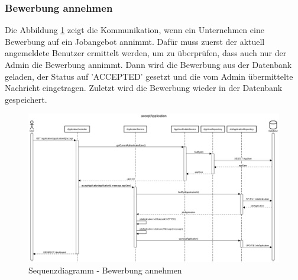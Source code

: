 \documentclass[12pt, letterpaper]{article}
\begin{document}
    \subsubsection{Bewerbung annehmen}

    Die Abbildung \ref{fig:Accept} zeigt die Kommunikation, wenn ein Unternehmen eine Bewerbung auf ein Jobangebot annimmt. Dafür muss zuerst
    der aktuell angemeldete Benutzer ermittelt werden, um zu überprüfen, dass auch nur der Admin die Bewerbung annimmt. 
    Dann wird die Bewerbung aus der Datenbank geladen, der Status auf 'ACCEPTED' gesetzt und die vom Admin übermittelte Nachricht eingetragen.
    Zuletzt wird die Bewerbung wieder in der Datenbank gespeichert.
    \begin{figure}[h!]
        \includegraphics[width = \linewidth]{sequence/acceptApplicationSequenzDiagramm.png}
        \caption{Sequenzdiagramm - Bewerbung annehmen}
        \label{fig:Accept}
    \end{figure}
\end{document}
